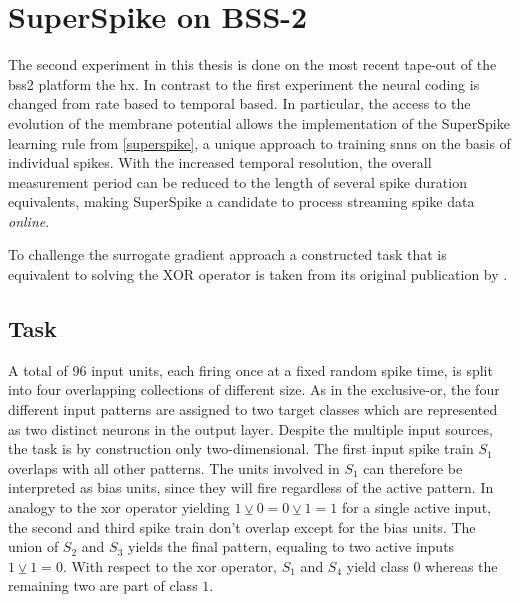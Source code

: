 \section{SuperSpike on BSS-2}

The second experiment in this thesis is done on the most recent tape-out of the \gls{bss2} platform the \gls{hx}. In contrast to the first experiment the neural coding is changed from rate based to temporal based. In particular, the access to the evolution of the membrane potential allows the implementation of the SuperSpike learning rule from \cref{superspike}, a unique approach to training \glspl{snn} on the basis of individual spikes. With the increased temporal resolution, the overall measurement period can be reduced to the length of several spike duration equivalents, making SuperSpike a candidate to process streaming spike data \emph{online}.

To challenge the surrogate gradient approach a constructed task that is equivalent to solving the XOR operator is taken from its original publication by \cite{zenke2018superspike}.

\subsection{Task}

A total of 96 input units, each firing once at a fixed random spike time, is split into four overlapping collections of different size. As in the exclusive-or, the four different input patterns are assigned to two target classes which are represented as two distinct neurons in the output layer. Despite the multiple input sources, the task is by construction only two-dimensional. The first input spike train $S_1$ overlaps with all other patterns. The units involved in $S_1$ can therefore be interpreted as bias units, since they will fire regardless of the active pattern. In analogy to the xor operator yielding $1 \veebar 0 = 0 \veebar 1 = 1$ for a single active input, the second and third spike train don't overlap except for the bias units. The union of $S_2$ and $S_3$ yields the final pattern, equaling to two active inputs $1 \veebar 1 = 0$. With respect to the xor operator, $S_1$ and $S_4$ yield class $0$ whereas the remaining two are part of class $1$. 

